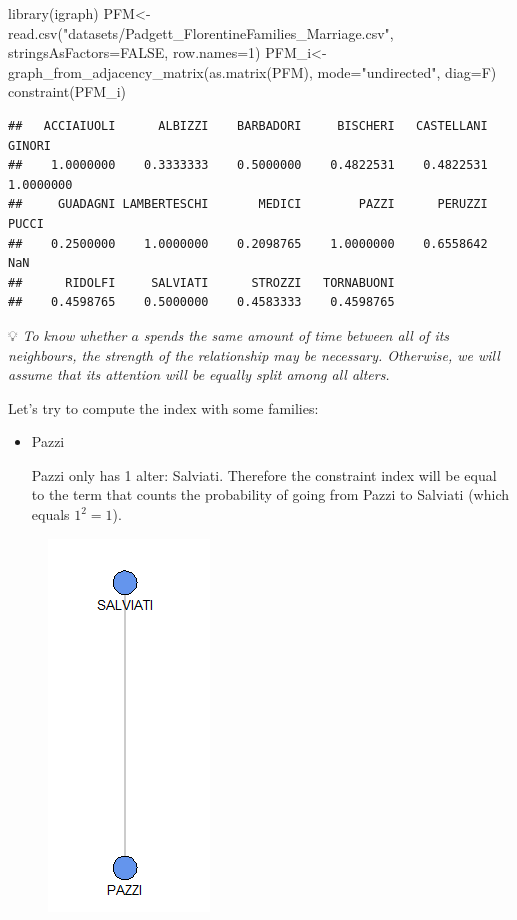 \documentclass[
  notitlepage,
  onecolumn,
  openany]{book}
\newenvironment{Shaded}{\begin{snugshade}}{\end{snugshade}}
\newcommand{\AttributeTok}[1]{\textcolor[rgb]{0.77,0.63,0.00}{#1}}
\newcommand{\ConstantTok}[1]{\textcolor[rgb]{0.00,0.00,0.00}{#1}}
\newcommand{\DecValTok}[1]{\textcolor[rgb]{0.00,0.00,0.81}{#1}}
\newcommand{\FunctionTok}[1]{\textcolor[rgb]{0.00,0.00,0.00}{#1}}
\newcommand{\NormalTok}[1]{#1}
\newcommand{\OtherTok}[1]{\textcolor[rgb]{0.56,0.35,0.01}{#1}}
\newcommand{\StringTok}[1]{\textcolor[rgb]{0.31,0.60,0.02}{#1}}
\begin{document}
\begin{Shaded}
\begin{Highlighting}[]
\FunctionTok{library}\NormalTok{(igraph)}
\NormalTok{PFM}\OtherTok{\textless{}{-}}\FunctionTok{read.csv}\NormalTok{(}\StringTok{"datasets/Padgett\_FlorentineFamilies\_Marriage.csv"}\NormalTok{,}
                            \AttributeTok{stringsAsFactors=}\ConstantTok{FALSE}\NormalTok{,}
                            \AttributeTok{row.names=}\DecValTok{1}\NormalTok{)}
\NormalTok{PFM\_i}\OtherTok{\textless{}{-}}\FunctionTok{graph\_from\_adjacency\_matrix}\NormalTok{(}\FunctionTok{as.matrix}\NormalTok{(PFM),}
                                   \AttributeTok{mode=}\StringTok{"undirected"}\NormalTok{,}
                                   \AttributeTok{diag=}\NormalTok{F)}
\FunctionTok{constraint}\NormalTok{(PFM\_i)}
\end{Highlighting}
\end{Shaded}

\begin{verbatim}
##   ACCIAIUOLI      ALBIZZI    BARBADORI     BISCHERI   CASTELLANI       GINORI 
##    1.0000000    0.3333333    0.5000000    0.4822531    0.4822531    1.0000000 
##     GUADAGNI LAMBERTESCHI       MEDICI        PAZZI      PERUZZI        PUCCI 
##    0.2500000    1.0000000    0.2098765    1.0000000    0.6558642          NaN 
##      RIDOLFI     SALVIATI      STROZZI   TORNABUONI 
##    0.4598765    0.5000000    0.4583333    0.4598765
\end{verbatim}

💡 \emph{To know whether \(a\) spends the same amount of time between all of its neighbours, the strength of the relationship may be necessary. Otherwise, we will assume that its attention will be equally split among all alters.}

Let's try to compute the index with some families:

\begin{itemize}
\item
  Pazzi

  Pazzi only has 1 alter: Salviati. Therefore the constraint index will be equal to the term that counts the probability of going from Pazzi to Salviati (which equals \(1^2 = 1\)).
\end{itemize}

\begin{figure}[h!]

{\centering \includegraphics[width=0.15\linewidth]{images/08-Metrics for structural holes/Untitled 4} 

}

\end{figure}
\end{document}
